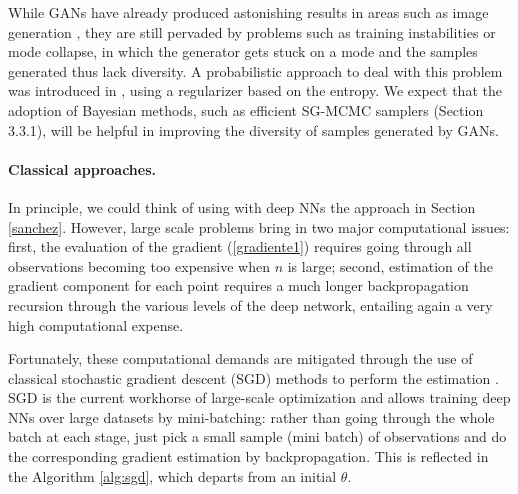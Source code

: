 While GANs have already produced astonishing results in areas such as image generation \cite{Karras2019stylegan2,brock2018large}, they are still pervaded by problems such as training instabilities or mode collapse, in which the generator gets stuck on a mode and the samples generated thus lack diversity. A probabilistic approach to deal with this problem was introduced in \cite{dieng2019prescribed}, using a regularizer based on the entropy. We expect that the adoption of Bayesian methods,
 such as efficient SG-MCMC samplers (Section 3.3.1), will be helpful
in improving the diversity of samples generated by GANs.

\paragraph{Classical approaches.}

In principle, we could think of using 
with deep NNs the approach in Section \ref{sanchez}. However,
 large scale problems bring in two major
computational issues: first, the 
evaluation of the gradient (\ref{gradiente1}) 
requires going through all observations
 becoming too expensive when $n$ is large;
second, estimation of the gradient component
for each point requires a much longer backpropagation recursion through the various levels of the
deep network, 
entailing again a very high computational 
expense. 

Fortunately, these computational demands are mitigated
through the use of classical stochastic gradient descent
(SGD)
methods \cite{robbins}
to perform the estimation \cite{bottou2010large}. SGD is the current workhorse of large-scale optimization and 
allows training deep NNs over large datasets by mini-batching: rather than going through the whole batch at each stage, just pick a small sample
(mini batch) of observations and do the corresponding
gradient estimation by backpropagation. This is reflected in the Algorithm \ref{alg:sgd}, which departs from an
initial $\theta$.

